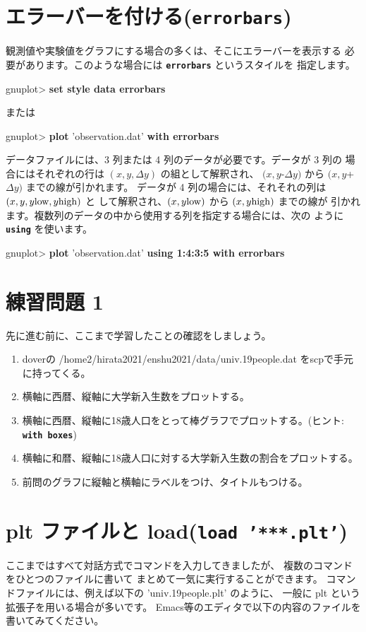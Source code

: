 \documentclass[a4j]{ujarticle} %
\newenvironment{terminal}{%
  \begin{center}
   \begin{minipage}{.8\textwidth}
    \setlength{\FrameSep}{.5\FrameSep}%
    \begin{framed}\ttfamily\small%
     \setlength\baselineskip{.85\baselineskip}%
}{%
    \end{framed}
   \end{minipage}
  \end{center}%
}
\begin{document}
\section{エラーバーを付ける({\tt\bf errorbars})}
観測値や実験値をグラフにする場合の多くは、そこにエラーバーを表示する
必要があります。このような場合には {\tt\bf errorbars} というスタイルを
指定します。
\begin{terminal}
gnuplot> {\bf set style data errorbars}
\end{terminal}
または
\begin{terminal}
gnuplot> {\bf plot} 'observation.dat' {\bf with errorbars}
\end{terminal}

データファイルには、3 列または 4 列のデータが必要です。データが 3 列の
場合にはそれぞれの行は $(x,y,\Delta y)$ の組として解釈され、
$(x,y$-$\Delta y)$ から $(x,y$+$\Delta y)$ までの線が引かれます。
データが 4 列の場合には、それそれの列は $(x,y,y{\rm low},y{\rm high})$ と
して解釈され、$(x,y{\rm low})$ から $(x,y{\rm high})$ までの線が
引かれます。複数列のデータの中から使用する列を指定する場合には、次の
ように {\tt\bf using} を使います。
\begin{terminal}
gnuplot> {\bf plot} 'observation.dat' {\bf using 1:4:3:5 with errorbars}
\end{terminal}
%

\section{練習問題 1}
先に進む前に、ここまで学習したことの確認をしましょう。
\begin{enumerate}
\item
     doverの /home2/hirata2021/enshu2021/data/univ.19people.dat をscpで手元に持ってくる。
\item
     横軸に西暦、縦軸に大学新入生数をプロットする。
\item
     横軸に西暦、縦軸に18歳人口をとって棒グラフでプロットする。(ヒント:{\tt\bf
     with boxes})
\item
     横軸に和暦、縦軸に18歳人口に対する大学新入生数の割合をプロットする。
\item
     前問のグラフに縦軸と横軸にラベルをつけ、タイトルもつける。\\
\end{enumerate}

\section{plt ファイルと load({\tt\bf load '***.plt'})}
ここまではすべて対話方式でコマンドを入力してきましたが、
複数のコマンドをひとつのファイルに書いて
まとめて一気に実行することができます。
コマンドファイルには、例えば以下の 'univ.19people.plt' のように、
一般に plt という拡張子を用いる場合が多いです。
Emacs等のエディタで以下の内容のファイルを書いてみてください。
\end{document}
